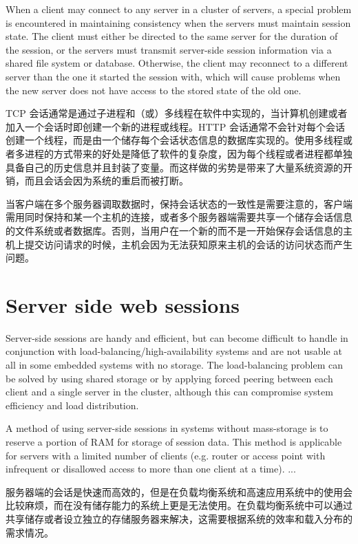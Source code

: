When a client may connect to any server in a cluster of servers, a special problem is encountered in maintaining consistency when the servers must maintain session state. The client must either be directed to the same server for the duration of the session, or the servers must transmit server-side session information via a shared file system or database. Otherwise, the client may reconnect to a different server than the one it started the session with, which will cause problems when the new server does not have access to the stored state of the old one.

TCP 会话通常是通过子进程和（或）多线程在软件中实现的，当计算机创建或者加入一个会话时即创建一个新的进程或线程。HTTP 会话通常不会针对每个会话创建一个线程，而是由一个储存每个会话状态信息的数据库实现的。使用多线程或者多进程的方式带来的好处是降低了软件的复杂度，因为每个线程或者进程都单独具备自己的历史信息并且封装了变量。而这样做的劣势是带来了大量系统资源的开销，而且会话会因为系统的重启而被打断。

当客户端在多个服务器调取数据时，保持会话状态的一致性是需要注意的，客户端需用同时保持和某一个主机的连接，或者多个服务器端需要共享一个储存会话信息的文件系统或者数据库。否则，当用户在一个新的而不是一开始保存会话信息的主机上提交访问请求的时候，主机会因为无法获知原来主机的会话的访问状态而产生问题。




\chapter{Server side web sessions}


Server-side sessions are handy and efficient, but can become difficult to handle in conjunction with load-balancing/high-availability systems and are not usable at all in some embedded systems with no storage. The load-balancing problem can be solved by using shared storage or by applying forced peering between each client and a single server in the cluster, although this can compromise system efficiency and load distribution.

A method of using server-side sessions in systems without mass-storage is to reserve a portion of RAM for storage of session data. This method is applicable for servers with a limited number of clients (e.g. router or access point with infrequent or disallowed access to more than one client at a time). ...

服务器端的会话是快速而高效的，但是在负载均衡系统和高速应用系统中的使用会比较麻烦，而在没有储存能力的系统上更是无法使用。在负载均衡系统中可以通过共享储存或者设立独立的存储服务器来解决，这需要根据系统的效率和载入分布的需求情况。

